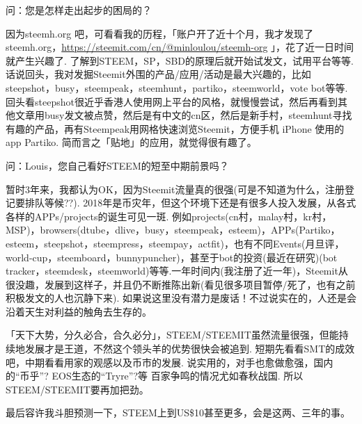 \documentclass[]{ctexbook}
\begin{document}
问：您是怎样走出起步的困局的？

因为steemh.org 吧，可看看我的历程，「账户开了近十个月，我才发现了steemh.org，\url{https://steemit.com/cn/@minloulou/steemh-org} 」，花了近一日时间就产生兴趣了. 了解到STEEM，SP，SBD的原理后就开始试发文，试用平台等等. 话说回头，我对发掘Steemit外围的产品/应用/活动是最大兴趣的，比如steepshot，busy，steempeak，steemhunt，partiko，steemworld，vote bot等等. 回头看steepshot很近乎香港人使用网上平台的风格，就慢慢尝试，然后再看到其他文章用busy发文被点赞，然后是有中文的cn区，然后是新手村，steemhunt寻找有趣的产品，再有Steempeak用网格快速浏览Steemit，方便手机 iPhone 使用的app Partiko. 简而言之「贴地」的应用，就觉得很有趣了。

问：Louis，您自己看好STEEM的短至中期前景吗？

暂时3年来，我都认为OK，因为Steemit流量真的很强(可是不知道为什么，注册登记要排队等候??). 2018年是币灾年，但这个环境下还是有很多人投入发展，从各式各样的APPs/projects的诞生可见一斑. 例如projects(cn村，malay村，kr村，MSP)，browsers(dtube，dlive，busy，steempeak，esteem)，APPs(Partiko，esteem，steepshot，steempress，steempay，actfit)，也有不同Events(月旦评，world-cup，steemboard，bunnypuncher)，甚至于bot的投资(最近在研究)(bot tracker，steemdesk，steemworld)等等.一年时间内(我注册了近一年)，Steemit从很没趣，发展到这样子，并且仍不断推陈出新(看见很多项目暂停/死了，也有之前积极发文的人也沉静下来). 如果说这里没有潜力是废话！不过说实在的，人还是会沿着天生对利益的触角去生存的。

「天下大势，分久必合，合久必分」，STEEM/STEEMIT虽然流量很强，但能持续地发展才是王道，不然这个领头羊的优势很快会被追到. 短期先看看SMT的成效吧，中期看看用家的观感以及币市的发展. 说实用的，对手也愈做愈强，国内的``币乎''? EOS生态的``Tryre''?等 百家争鸣的情况尤如春秋战国. 所以STEEM/STEEMIT要再加把劲。

最后容许我斗胆预测一下，STEEM上到US\$10甚至更多，会是这两、三年的事。
\end{document}
